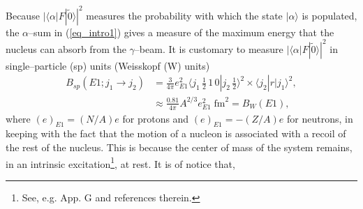 Because $|\langle \alpha|F|\tilde 0\rangle|^2$ measures the probability with which the state $|\alpha\rangle$ is populated, the $\alpha$--sum in (\ref{eq_intro1}) gives a measure of the maximum energy that the nucleus can absorb from the $\gamma$--beam. It is customary to measure  $|\langle \alpha|F|\tilde0\rangle|^2$ in single--particle (sp) units (Weisskopf (W) units)
\begin{align}\label{eq1.2.5}
\nonumber B_{sp}(E1;j_1\rightarrow j_2)&=\frac{3}{4\pi}e^2_{E1}\langle j_1\, \tfrac{1}{2}\,1\,0|j_2\,\tfrac{1}{2}\rangle^2\times \langle j_2|r|j_1\rangle^2,\\
&\approx \frac{0.81}{4\pi}A^{2/3}e^2_{E1}\;\text{fm}^2=B_W(E1),
\end{align}
where $(e)_{E1}=(N/A)e$ for protons and  $(e)_{E1}=-(Z/A)e$ for neutrons, in keeping with the fact that the motion of a nucleon is associated with a recoil of the rest of the nucleus. This is because the center of mass  of the system remains,   in an intrinsic excitation\footnote{See, e.g. \cite{Broglia:16} App. G and references therein.}, at rest. It is of notice that,


